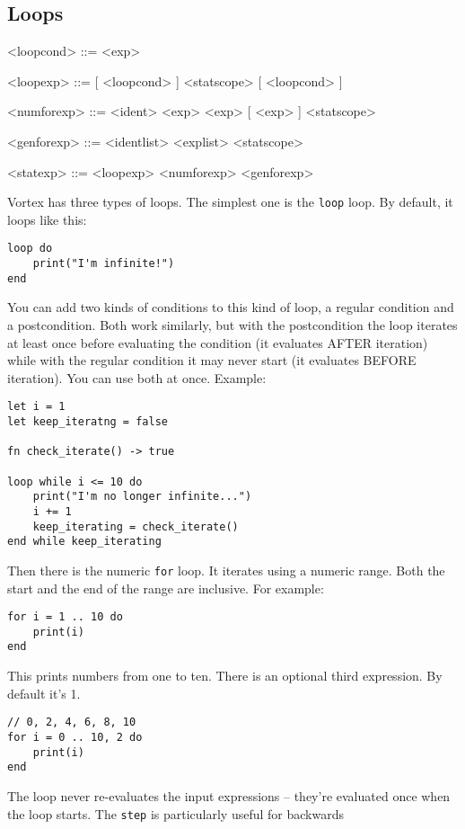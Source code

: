\documentclass{article}
\newenvironment{bnf}
{
\begin{mdframed}
\begin{grammar}
}
{
\end{grammar}
\end{mdframed}
}
\begin{document}
\subsection{Loops}
\begin{bnf}
<loopcond> ::=  <exp>

<loopexp> ::=  [ <loopcond> ] <statscope> [ <loopcond> ]

<numforexp> ::=  <ident> \lit{=} <exp>  <exp>
    [ \lit{,} <exp> ] <statscope>

<genforexp> ::=  <identlist>  <explist> <statscope>

<statexp> ::= <loopexp>
    \alt <numforexp>
    \alt <genforexp>
\end{bnf}
Vortex has three types of loops. The simplest one is the \verb|loop| loop.
By default, it loops like this:
\begin{lstlisting}[language=vortex]
loop do
    print("I'm infinite!")
end
\end{lstlisting}
You can add two kinds of conditions to this kind of loop, a regular condition
and a postcondition. Both work similarly, but with the postcondition the loop
iterates at least once before evaluating the condition (it evaluates AFTER
iteration) while with the regular condition it may never start (it evaluates
BEFORE iteration). You can use both at once. Example:
\begin{lstlisting}[language=vortex]
let i = 1
let keep_iteratng = false

fn check_iterate() -> true

loop while i <= 10 do
    print("I'm no longer infinite...")
    i += 1
    keep_iterating = check_iterate()
end while keep_iterating
\end{lstlisting}
Then there is the numeric \verb|for| loop. It iterates using a numeric range.
Both the start and the end of the range are inclusive. For example:
\begin{lstlisting}[language=vortex]
for i = 1 .. 10 do
    print(i)
end
\end{lstlisting}
This prints numbers from one to ten. There is an optional third 
expression. By default it's 1.
\begin{lstlisting}[language=vortex]
// 0, 2, 4, 6, 8, 10
for i = 0 .. 10, 2 do
    print(i)
end
\end{lstlisting}
The loop never re-evaluates the input expressions -- they're evaluated once
when the loop starts. The \verb|step| is particularly useful for backwards
\end{document}

